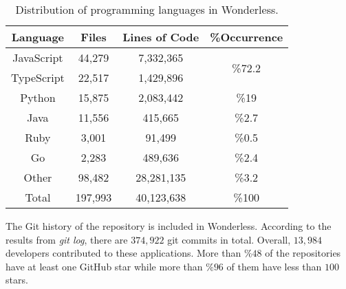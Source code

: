 \vspace{-2mm}
\begin{table}[h]
	\begin{center}
		\caption{Distribution of programming languages in Wonderless.}
		\label{tab:pl}
		\begin{tabular}{c|c|c|c}
			\textbf{Language} & \textbf{Files} & \textbf{Lines of Code} & \textbf{\%Occurrence} \\
			\toprule
			JavaScript &  44,279 & 7,332,365 & \multirow{2}{*}{\%72.2} \\
			TypeScript & 22,517 & 1,429,896 &  \\ \midrule
			Python & 15,875 & 2,083,442 & \%19 \\ \midrule
			Java & 11,556 & 415,665 & \%2.7  \\ \midrule
			Ruby & 3,001 & 91,499 & \%0.5  \\ \midrule
			Go & 2,283 & 489,636 & \%2.4 \\ \midrule
			Other & 98,482 & 28,281,135 & \%3.2 \\ \midrule
			Total & 197,993 & 40,123,638 & \%100\\ \midrule
		\end{tabular}
	\end{center}
\end{table}
\vspace{-5mm}

The Git history of the repository is included in Wonderless. 
According to the results from \emph{git log}, there are $374,922$ git commits in total. 
Overall, $13,984$ developers contributed to these applications.
More than $\%48$ of the repositories have at least one 
GitHub star while more than $\%96$ of them have less than $100$ stars.



